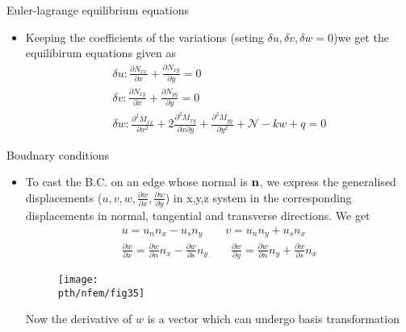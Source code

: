 	\begin{frame}{Euler-lagrange equilibrium equations}
		\begin{itemize}
			\item Keeping the coefficients of the variations (seting $\delta u, \delta v, \delta w = 0$)we get the equilibirum equations given as
			\begin{equation}
			\begin{aligned}
				\delta u : \frac{\partial N_{xx}}{\partial x} + \frac{\partial N_{xy}}{\partial y} = 0\\
				\delta v : \frac{\partial N_{xy}}{\partial x} + \frac{\partial N_{yy}}{\partial y} = 0\\
				\delta w : \frac{\partial^2 M_{xx}}{\partial x^2} + 2\frac{\partial^2 M_{xy}}{\partial x \partial y} + \frac{\partial^2 M_{yy}}{\partial y^2} + \mathcal{N} - kw + q = 0
			\end{aligned}
			\end{equation}
		\end{itemize}
	\end{frame}


	\begin{frame}{Boudnary conditions}
		\begin{itemize}
			\item To cast the B.C. on an edge whose normal is $\mathbf{n}$, we express the generalised displacements ($u,v,w,\frac{\partial w}{\partial x}, \frac{\partial w}{\partial y}$) in x,y,z system in the corresponding displacements in normal, tangential and transverse directions. We get
			\begin{equation}
			\begin{aligned}
				u = u_nn_x - u_sn_y \qquad v = u_nn_y + u_sn_x \\ 
				\frac{\partial w}{\partial x} = \frac{\partial w}{\partial n} n_x 
				- \frac{\partial w}{\partial s}n_y \qquad 
				\frac{\partial w}{\partial y} = \frac{\partial w}{\partial n}n_y
				+ \frac{\partial w}{\partial s}n_x
			\end{aligned}
			\end{equation}
			\begin{figure}
				\centering
				\texttt{[image: \\pth/nfem/fig35]} 		
			\end{figure}
		Now the derivative of $w$ is a vector which can undergo basis transformation
 		\end{itemize}
	\end{frame}


